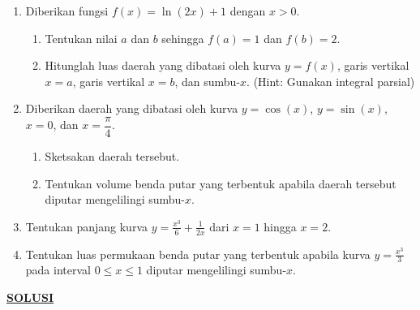 \documentclass[a4paper,12pt]{article}
\begin{document}
\begin{enumerate}
  \item Diberikan fungsi $f(x) = \ln(2x)+1$ dengan $x > 0$.
        \begin{enumerate}
          \item Tentukan nilai $a$ dan $b$ sehingga $f(a)=1$ dan $f(b)=2$.
          \item Hitunglah luas daerah yang dibatasi oleh kurva $y = f(x)$, garis vertikal $x = a$, garis vertikal $x = b$, dan sumbu-$x$.
                (Hint: Gunakan integral parsial)
        \end{enumerate}


  \item Diberikan daerah yang dibatasi oleh kurva $y = \cos(x)$, $y = \sin(x)$, $x = 0$, dan $x = \dfrac{\pi}{4}$.
        \begin{enumerate}
          \item Sketsakan daerah tersebut.
          \item Tentukan volume benda putar yang terbentuk apabila daerah tersebut diputar mengelilingi sumbu-$x$.
        \end{enumerate}

  \item Tentukan panjang kurva $\displaystyle y = \frac{x^3}{6} + \frac{1}{2x}$ dari $x = 1$ hingga $x = 2$.

  \item Tentukan luas permukaan benda putar yang terbentuk apabila kurva $\displaystyle y = \frac{x^3}{3}$ pada interval $0 \le x \le 1$ diputar mengelilingi sumbu-$x$.
\end{enumerate}
\newpage
\begin{center}
  {\Large \textbf{\underline{ SOLUSI }}}
\end{center}
\end{document}
